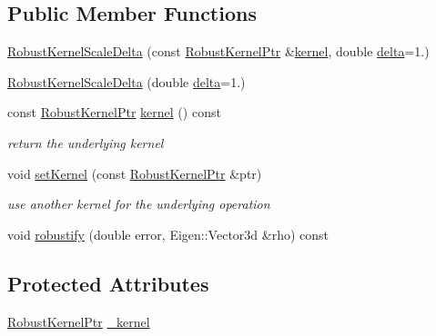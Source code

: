 \subsection*{Public Member Functions}
\begin{DoxyCompactItemize}
\item 
\mbox{\hyperlink{classg2o_1_1_robust_kernel_scale_delta_acffeae7f685e69018f5b0222155a6eb2}{Robust\+Kernel\+Scale\+Delta}} (const \mbox{\hyperlink{namespaceg2o_a0802a5e01a6b1861ae01013220dec6ac}{Robust\+Kernel\+Ptr}} \&\mbox{\hyperlink{classg2o_1_1_robust_kernel_scale_delta_a0d7d1119654f6e604609bb5b62e79cf2}{kernel}}, double \mbox{\hyperlink{classg2o_1_1_robust_kernel_affb1dacfd8507540281ff3af2ae6eeb8}{delta}}=1.)
\item 
\mbox{\hyperlink{classg2o_1_1_robust_kernel_scale_delta_a537a88b2ff5432fb9e1ad2aaa85f60b9}{Robust\+Kernel\+Scale\+Delta}} (double \mbox{\hyperlink{classg2o_1_1_robust_kernel_affb1dacfd8507540281ff3af2ae6eeb8}{delta}}=1.)
\item 
const \mbox{\hyperlink{namespaceg2o_a0802a5e01a6b1861ae01013220dec6ac}{Robust\+Kernel\+Ptr}} \mbox{\hyperlink{classg2o_1_1_robust_kernel_scale_delta_a0d7d1119654f6e604609bb5b62e79cf2}{kernel}} () const
\begin{DoxyCompactList}\small\item\em return the underlying kernel \end{DoxyCompactList}\item 
void \mbox{\hyperlink{classg2o_1_1_robust_kernel_scale_delta_a3bcc51d0cf3127e8c0431d1cddc1c75b}{set\+Kernel}} (const \mbox{\hyperlink{namespaceg2o_a0802a5e01a6b1861ae01013220dec6ac}{Robust\+Kernel\+Ptr}} \&ptr)
\begin{DoxyCompactList}\small\item\em use another kernel for the underlying operation \end{DoxyCompactList}\item 
void \mbox{\hyperlink{classg2o_1_1_robust_kernel_scale_delta_a97376c3ba35370fa551e899fd5391a2f}{robustify}} (double error, Eigen\+::\+Vector3d \&rho) const
\end{DoxyCompactItemize}
\subsection*{Protected Attributes}
\begin{DoxyCompactItemize}
\item 
\mbox{\hyperlink{namespaceg2o_a0802a5e01a6b1861ae01013220dec6ac}{Robust\+Kernel\+Ptr}} \mbox{\hyperlink{classg2o_1_1_robust_kernel_scale_delta_a4a2976cb5f12553f0e00dfdf239b1231}{\+\_\+kernel}}
\end{DoxyCompactItemize}


